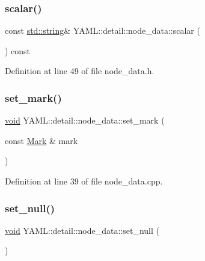 \subsubsection{\texorpdfstring{scalar()}{scalar()}}
{\footnotesize\ttfamily const \mbox{\hyperlink{glad_8h_ac83513893df92266f79a515488701770}{std\+::string}}\& Y\+A\+M\+L\+::detail\+::node\+\_\+data\+::scalar (\begin{DoxyParamCaption}{ }\end{DoxyParamCaption}) const\hspace{0.3cm}{\ttfamily [inline]}}



Definition at line 49 of file node\+\_\+data.\+h.

\mbox{\label{class_y_a_m_l_1_1detail_1_1node__data_a85509514e2fb3cab1e55a6e1fead816f}} 
\subsubsection{\texorpdfstring{set\_mark()}{set\_mark()}}
{\footnotesize\ttfamily \mbox{\hyperlink{glad_8h_a950fc91edb4504f62f1c577bf4727c29}{void}} Y\+A\+M\+L\+::detail\+::node\+\_\+data\+::set\+\_\+mark (\begin{DoxyParamCaption}\item[{const \mbox{\hyperlink{struct_y_a_m_l_1_1_mark}{Mark}} \&}]{mark }\end{DoxyParamCaption})}



Definition at line 39 of file node\+\_\+data.\+cpp.

\mbox{\label{class_y_a_m_l_1_1detail_1_1node__data_a765300dc8a23d9e5d9d0eccdd4127ee9}} 
\subsubsection{\texorpdfstring{set\_null()}{set\_null()}}
{\footnotesize\ttfamily \mbox{\hyperlink{glad_8h_a950fc91edb4504f62f1c577bf4727c29}{void}} Y\+A\+M\+L\+::detail\+::node\+\_\+data\+::set\+\_\+null (\begin{DoxyParamCaption}{ }\end{DoxyParamCaption})}



